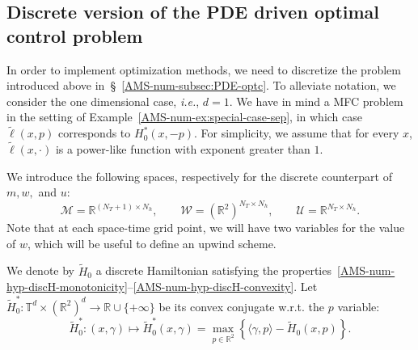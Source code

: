 \documentclass{amsproc}
\theoremstyle{definition}
\theoremstyle{remark}
\numberwithin{equation}{section}
\newcommand{\RR}{{\mathbb R}}
\newcommand{\TT}{{\mathbb T}}
\newcommand{\cM}{{\mathcal M}}
\newcommand{\cU}{{\mathcal U}}
\newcommand{\cW}{{\mathcal W}}
\begin{document}
\subsection{Discrete version of the PDE driven optimal control problem}
\label{AMS-num-subsec:PDE-optc-discrete}

In order to implement optimization methods, we need to discretize the problem introduced above in~\S~\ref{AMS-num-subsec:PDE-optc}.  To alleviate notation, we consider the one dimensional case, \textit{i.e.}, $d=1$. We have in mind a MFC problem in the setting of Example~\ref{AMS-num-ex:special-case-sep}, in which case $\tilde \ell(x,p)$ corresponds to $H_0^*(x, -p)$. For simplicity, we assume that for every $x$, $\tilde \ell(x,\cdot)$ is a power-like function with exponent greater than $1$. 

 We introduce the following spaces, respectively for the discrete counterpart of $m,w,$ and $u$:
$$
	\cM = \RR^{(N_T+1) \times N_h}, 
	\qquad 
	\cW = (\RR^2)^{N_T \times N_h}, 
	\qquad
	\cU = \RR^{N_T \times N_h}.
$$
Note that at each space-time grid point, we will have two variables for the value of $w$, which will be useful to define an upwind scheme.

We denote by $\tilde H_0$ a discrete Hamiltonian satisfying  the properties~\ref{AMS-num-hyp-discH-monotonicity}--\ref{AMS-num-hyp-discH-convexity}. Let $\tilde H^*_0: \TT^d \times (\RR^2)^d \to \RR \cup \{+\infty\}$ be its convex conjugate w.r.t. the $p$ variable:
\begin{equation}
\label{eq:var:1}  
	\tilde H^*_0: 
	(x,\gamma) \mapsto 
	\tilde H^*_0(x, \gamma)
	=
	\max_{p \in \RR^2} \left\{ \langle \gamma , p \rangle - \tilde H_0(x, p) \right\}.
\end{equation}
\end{document}
